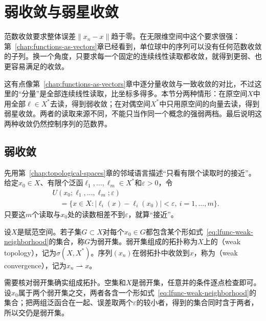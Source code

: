 \section{弱收敛与弱星收敛}
\label{sec:lfunc-weak-convergence}

范数收敛要求整体误差$\lVert x_n-x\rVert$趋于零。在无限维空间中这个要求很强：第~\ref{chap:functions-as-vectors}章已经看到，单位球中的序列可以没有任何范数收敛的子列。换一个角度，只要求每一个固定的连续线性读取都收敛，就得到更弱、也更容易满足的收敛。

这有点像第~\ref{chap:functions-as-vectors}章中逐分量收敛与一致收敛的对比，不过这里的“分量”是全部连续线性读取，比坐标多得多。本节分两种情形：在原空间$X$中用全部$\ell\in X^*$去读，得到弱收敛；在对偶空间$X^*$中只用原空间的向量去读，得到弱星收敛。两者的读取来源不同，不能只当作同一个概念的强弱两档。最后说明这两种收敛仍然控制序列的范数界。

\subsection{弱收敛}
\label{sec:lfunc-weak}

先用第~\ref{chap:topological-spaces}章的邻域语言描述“只看有限个读取时的接近”。给定$x_0\in X$、有限个泛函$\ell_1,\ldots,\ell_m\in X^*$和$\varepsilon>0$，令
\begin{equation}
\begin{aligned}
&U(x_0;\ell_1,\ldots,\ell_m;\varepsilon)\\
&\quad=\{x\in X:\lvert\ell_i(x)-\ell_i(x_0)\rvert<\varepsilon,\ i=1,\ldots,m\}.
\end{aligned}
\label{eq:lfunc-weak-neighborhood}
\end{equation}
只要这$m$个读取与$x_0$处的读数相差不到$\varepsilon$，就算“接近”。

\begin{definition}[弱拓扑与弱收敛]
\label{def:lfunc-weak-topology}
设$X$是赋范空间。若子集$G\subset X$对每个$x_0\in G$都包含某个形如式~\eqref{eq:lfunc-weak-neighborhood}的集合，称$G$为弱开集。弱开集组成的拓扑称为$X$上的（weak topology），记为$\sigma(X,X^*)$。序列$(x_n)$在弱拓扑中收敛到$x$，称为（weak convergence），记为$x_n\rightharpoonup x$。
\end{definition}

需要核对弱开集确实组成拓扑。空集和$X$是弱开集，任意并的条件逐点检查即可。设$x_0$属于两个弱开集之交，两者各含一个形如式~\eqref{eq:lfunc-weak-neighborhood}的集合；把两组泛函合在一起、误差取两个$\varepsilon$的较小者，得到的集合同时含于两者，所以交仍是弱开集。

